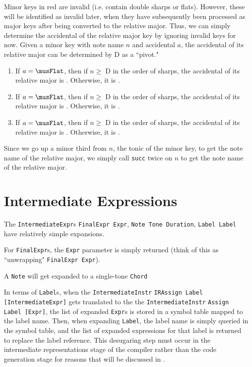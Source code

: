 \documentclass{report}
\begin{document}
Minor keys in red are invalid (i.e. contain double sharps or flats). However, these will be identified as invalid later, when they have subsequently been processed as major keys after being converted to the relative major. Thus, we can simply determine the accidental of the relative major key by ignoring invalid keys for now. Given a minor key with note name $n$ and accidental $a$, the accidental of its relative major can be determined by D as a ``pivot." 

\begin{enumerate}
\item If $a=\musFlat$, then if $n \geq$ D in the order of sharps, the accidental of its relative major is \musSharp. Otherwise, it is \musNatural.
\item If $a=\musFlat$, then if $n \geq$ D in the order of sharps, the accidental of its relative major is \musFlat. Otherwise, it is \musDoubleFlat.
\item If $a=\musFlat$, then if $n \geq$ D in the order of sharps, the accidental of its relative major is \musNatural. Otherwise, it is \musFlat.
\end{enumerate}

Since we go up a minor third from $n$, the tonic of the minor key, to get  the note name of the relative major, we simply call \verb.succ. twice on $n$ to get the note name of the relative major.

\section{Intermediate Expressions}
\label{sec:irexpr}

The \verb.IntermediateExpr.s \verb.FinalExpr Expr., \verb.Note Tone Duration., \verb.Label Label. have relatively simple expansions. 

For \verb.FinalExpr.s, the \verb.Expr. parameter is simply returned (think of this as ``unwrapping" \verb.FinalExpr Expr.). 

A \verb.Note. will get expanded to a single-tone \verb.Chord.

In terms of \verb.Label.s, when the \verb.IntermediateInstr. \verb.IRAssign Label [IntermediateExpr]. gets translated to the the \verb.IntermediateInstr. \verb.Assign Label [Expr]., the list of expanded \verb.Expr.s is stored in a symbol table mapped to the label name. Then, when expanding \verb.Label., the label name is simply queried in the symbol table, and the list of expanded expressions for that label is returned to replace the label reference. This desugaring step must occur in the intermediate representations stage of the compiler rather than the code generation stage for reasons that will be discussed in .
\end{document}

